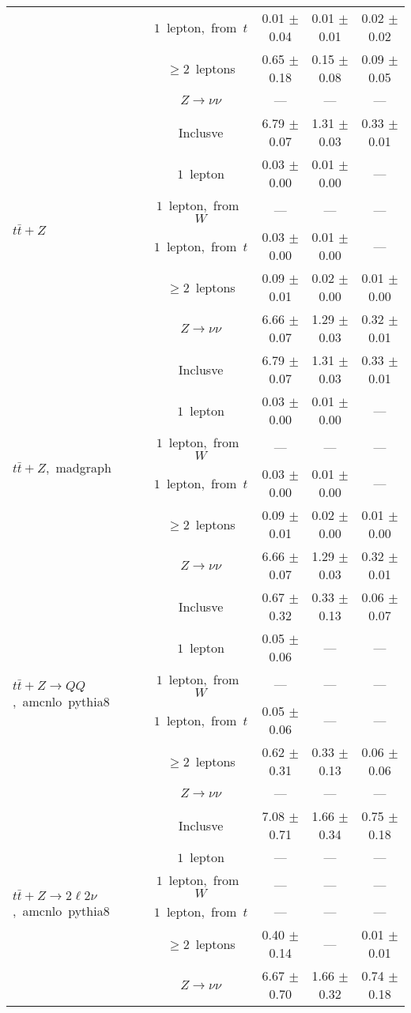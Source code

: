 \documentclass{article}
\begin{document}
\begin{longtable}{|l|c|c|c|c|}
 & $1$~lepton,~from~$t$  & 0.01 $\pm$ 0.04  & 0.01 $\pm$ 0.01  & 0.02 $\pm$ 0.02 \\* 
 & $\ge2$~leptons  & 0.65 $\pm$ 0.18  & 0.15 $\pm$ 0.08  & 0.09 $\pm$ 0.05 \\* 
 & $Z\rightarrow\nu\nu$  & ---  & ---  & --- \\* 
\hline 
\multirow{6}{*}{$t\bar{t}+Z$} & Inclusve  & 6.79 $\pm$ 0.07  & 1.31 $\pm$ 0.03  & 0.33 $\pm$ 0.01 \\* 
 & $1$~lepton  & 0.03 $\pm$ 0.00  & 0.01 $\pm$ 0.00  & --- \\* 
 & $1$~lepton,~from~$W$  & ---  & ---  & --- \\* 
 & $1$~lepton,~from~$t$  & 0.03 $\pm$ 0.00  & 0.01 $\pm$ 0.00  & --- \\* 
 & $\ge2$~leptons  & 0.09 $\pm$ 0.01  & 0.02 $\pm$ 0.00  & 0.01 $\pm$ 0.00 \\* 
 & $Z\rightarrow\nu\nu$  & 6.66 $\pm$ 0.07  & 1.29 $\pm$ 0.03  & 0.32 $\pm$ 0.01 \\* 
\hline 
\multirow{6}{*}{$t\bar{t}+Z$,~madgraph} & Inclusve  & 6.79 $\pm$ 0.07  & 1.31 $\pm$ 0.03  & 0.33 $\pm$ 0.01 \\* 
 & $1$~lepton  & 0.03 $\pm$ 0.00  & 0.01 $\pm$ 0.00  & --- \\* 
 & $1$~lepton,~from~$W$  & ---  & ---  & --- \\* 
 & $1$~lepton,~from~$t$  & 0.03 $\pm$ 0.00  & 0.01 $\pm$ 0.00  & --- \\* 
 & $\ge2$~leptons  & 0.09 $\pm$ 0.01  & 0.02 $\pm$ 0.00  & 0.01 $\pm$ 0.00 \\* 
 & $Z\rightarrow\nu\nu$  & 6.66 $\pm$ 0.07  & 1.29 $\pm$ 0.03  & 0.32 $\pm$ 0.01 \\* 
\hline 
\multirow{6}{*}{$t\bar{t}+Z{\rightarrow}QQ$,~amcnlo~pythia8} & Inclusve  & 0.67 $\pm$ 0.32  & 0.33 $\pm$ 0.13  & 0.06 $\pm$ 0.07 \\* 
 & $1$~lepton  & 0.05 $\pm$ 0.06  & ---  & --- \\* 
 & $1$~lepton,~from~$W$  & ---  & ---  & --- \\* 
 & $1$~lepton,~from~$t$  & 0.05 $\pm$ 0.06  & ---  & --- \\* 
 & $\ge2$~leptons  & 0.62 $\pm$ 0.31  & 0.33 $\pm$ 0.13  & 0.06 $\pm$ 0.06 \\* 
 & $Z\rightarrow\nu\nu$  & ---  & ---  & --- \\* 
\hline 
\multirow{6}{*}{$t\bar{t}+Z{\rightarrow}2{\ell}2{\nu}$,~amcnlo~pythia8} & Inclusve  & 7.08 $\pm$ 0.71  & 1.66 $\pm$ 0.34  & 0.75 $\pm$ 0.18 \\* 
 & $1$~lepton  & ---  & ---  & --- \\* 
 & $1$~lepton,~from~$W$  & ---  & ---  & --- \\* 
 & $1$~lepton,~from~$t$  & ---  & ---  & --- \\* 
 & $\ge2$~leptons  & 0.40 $\pm$ 0.14  & ---  & 0.01 $\pm$ 0.01 \\* 
 & $Z\rightarrow\nu\nu$  & 6.67 $\pm$ 0.70  & 1.66 $\pm$ 0.32  & 0.74 $\pm$ 0.18 \\* 
\hline 
\end{longtable} 
\end{document}
